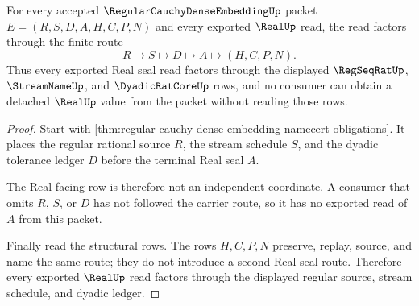 \begin{theorem}
\label{thm:regular-cauchy-dense-embedding-real-boundary}
For every accepted $\RegularCauchyDenseEmbeddingUp$ packet $E=(R,S,D,A,H,C,P,N)$ and every exported $\RealUp$ read, the read factors through the finite route
$$
R\longmapsto S\longmapsto D\longmapsto A\longmapsto(H,C,P,N).
$$
Thus every exported Real seal read factors through the displayed $\RegSeqRatUp$, $\StreamNameUp$, and $\DyadicRatCoreUp$ rows, and no consumer can obtain a detached $\RealUp$ value from the packet without reading those rows.
\end{theorem}
\begin{proof}
Start with \autoref{thm:regular-cauchy-dense-embedding-namecert-obligations}. It places the regular rational source $R$, the stream schedule $S$, and the dyadic tolerance ledger $D$ before the terminal Real seal $A$.

The Real-facing row is therefore not an independent coordinate. A consumer that omits $R$, $S$, or $D$ has not followed the carrier route, so it has no exported read of $A$ from this packet.

Finally read the structural rows. The rows $H,C,P,N$ preserve, replay, source, and name the same route; they do not introduce a second Real seal route. Therefore every exported $\RealUp$ read factors through the displayed regular source, stream schedule, and dyadic ledger.
\end{proof}



